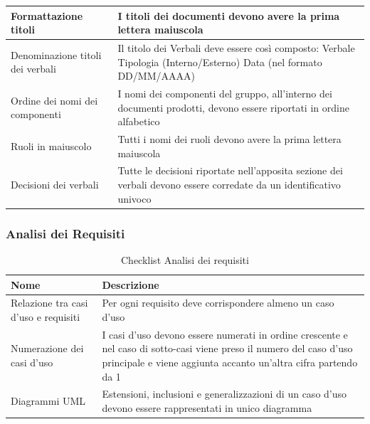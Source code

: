 \documentclass[a4paper,12pt]{article}
\begin{document}
\begin{longtable}{|M{3.5cm}|M{8.5cm}|}
                    Formattazione titoli & I titoli dei documenti devono avere la prima lettera maiuscola \\
                    \hline

                    Denominazione titoli dei verbali & Il titolo dei Verbali deve essere così composto: Verbale Tipologia (Interno/Esterno) Data (nel formato DD/MM/AAAA) \\
                    \hline

                    Ordine dei nomi dei componenti & I nomi dei componenti del gruppo, all’interno dei documenti prodotti, devono essere riportati in ordine alfabetico \\
                    \hline

                    Ruoli in maiuscolo & Tutti i nomi dei ruoli devono avere la prima lettera maiuscola \\
                    \hline

                    Decisioni dei verbali & Tutte le decisioni riportate nell’apposita sezione dei verbali devono essere corredate da un identificativo univoco \\
                    \hline

                \end{longtable}

            \subsubsection{Analisi dei Requisiti}

                \begin{longtable}{|M{3.5cm}|M{8.5cm}|}
                    
                    \caption{Checklist Analisi dei requisiti} \\
                    \hline
                    \textbf{Nome} & \textbf{Descrizione} \\
                    \hline
                    \endhead

                    Relazione tra casi d’uso e requisiti & Per ogni requisito deve corrispondere almeno un caso d’uso \\
                    \hline

                    Numerazione dei casi d’uso & I casi d’uso devono essere numerati in ordine crescente e nel caso di sotto-casi viene preso il numero del caso d’uso principale e viene aggiunta accanto un’altra cifra partendo da 1 \\
                    \hline

                    Diagrammi UML & Estensioni, inclusioni e generalizzazioni di un caso d’uso devono essere rappresentati in unico diagramma \\
                    \hline

                \end{longtable}
        
\end{document}
